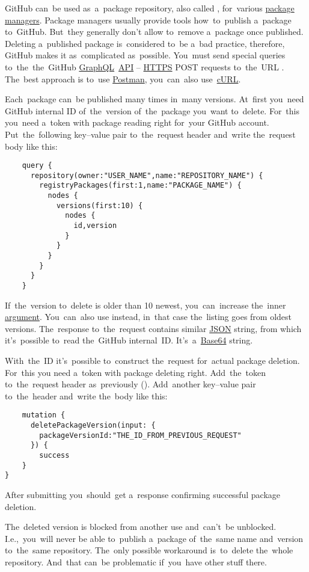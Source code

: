 \label{githubdeletepackage}
GitHub can~be used as~a~package repository, also called , for~various \hyperref[packagemanager]{package managers}.
Package managers usually provide tools how~to~publish a~package to~GitHub.
But~they generally don't allow to~remove a~package once published.
Deleting a~published package is~considered to~be a~bad practice, therefore, GitHub makes it as~complicated as~possible.
You~must send special queries to~the~the~GitHub \hyperref[graphql]{GraphQL}~\hyperref[api]{API} -- \hyperref[https]{HTTPS} POST requests to~the~URL .
The~best approach is to~use \href{https://www.getpostman.com/}{Postman}, you~can~also use~\hyperref[curl]{cURL}.

Each~package can~be published many times in~many versions.
At~first you~need GitHub internal ID of~the~version of~the~package you~want to~delete.
For~this you~need a~token with package reading right for~your GitHub account.
Put~the~following key--value pair  to~the~request header and~write the~request body like this:
\begin{lstlisting}
    query {
      repository(owner:"USER_NAME",name:"REPOSITORY_NAME") {
        registryPackages(first:1,name:"PACKAGE_NAME") {
          nodes {
            versions(first:10) {
              nodes {
                id,version
              }
            }
          }
        }
      }
    }
\end{lstlisting}

\noindent If~the~version to~delete is older than 10 newest, you~can~increase the~inner  \hyperref[parameterargument]{argument}.
You~can~also use  instead, in~that case the~listing goes from oldest versions.
The~response to~the~request contains similar \hyperref[json]{JSON} string, from which it's~possible to~read the~GitHub internal~ID\@.
It's~a~\hyperref[base64]{Base64} string.

With~the~ID it's~possible to~construct the~request for~actual package deletion.
For~this you need a~token with package deleting right.
Add~the~token to~the~request header as~previously ().
Add~another key--value pair  to~the~header and~write the~body like this:
\begin{lstlisting}
    mutation {
      deletePackageVersion(input: {
        packageVersionId:"THE_ID_FROM_PREVIOUS_REQUEST"
      }) {
        success
    }
}
\end{lstlisting}

\noindent After submitting you~should~get a~response confirming successful package deletion.

\warning The~deleted version is blocked from another use and~can't~be unblocked.
I.e.,~you~will never be able to~publish a~package of~the~same name and~version to~the~same repository.
The~only possible workaround is~to~delete the~whole repository.
And~that can~be problematic if~you~have other stuff there.
